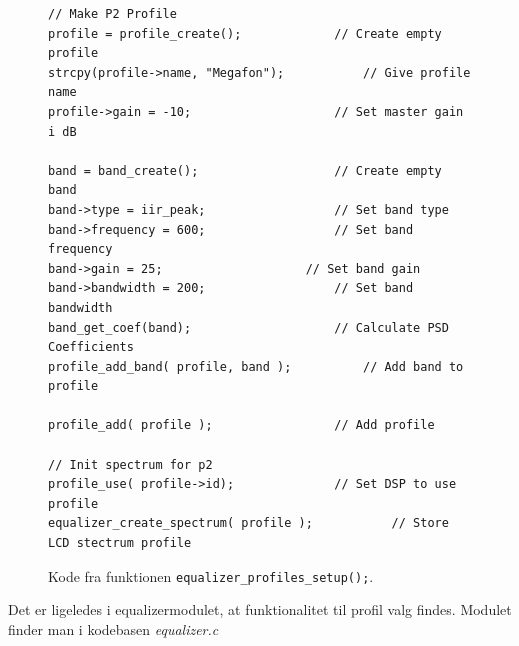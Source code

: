 \begin{figure}[h!]
\centering	
{}
\begin{lstlisting}
// Make P2 Profile
profile = profile_create();				// Create empty profile
strcpy(profile->name, "Megafon");			// Give profile name
profile->gain = -10;					// Set master gain i dB

band = band_create();					// Create empty band
band->type = iir_peak;					// Set band type
band->frequency = 600;					// Set band frequency
band->gain = 25;					// Set band gain
band->bandwidth = 200;					// Set band bandwidth
band_get_coef(band);					// Calculate PSD Coefficients
profile_add_band( profile, band );			// Add band to profile

profile_add( profile );					// Add profile

// Init spectrum for p2
profile_use( profile->id);				// Set DSP to use profile
equalizer_create_spectrum( profile );			// Store LCD stectrum profile
\end{lstlisting}
\caption{Kode fra funktionen \texttt{equalizer\_profiles\_setup();}.}
\label{lst:eq_profil_setup}
\end{figure}

Det er ligeledes i equalizermodulet, at funktionalitet til profil valg findes.
Modulet finder man i kodebasen \textit{equalizer.c}


  




